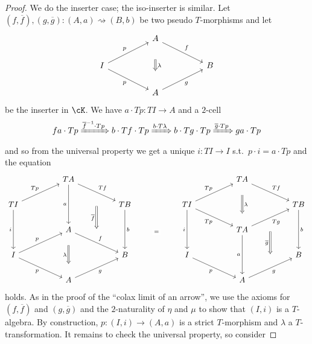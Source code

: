 \documentclass[a4paper,11pt,oneside,openany]{scrbook}
\begin{document}
\begin{proof}
    We do the inserter case; the iso-inserter is similar. Let $(f,\overline{f}),(g,\overline{g})\colon(A,a)\rightsquigarrow(B,b)$ be two pseudo $T$-morphisms and let 
    \[\begin{tikzcd}
	&& A \\
	I &&&& B \\
	&& A
	\arrow["p", from=2-1, to=1-3]
	\arrow["f", from=1-3, to=2-5]
	\arrow["p"', from=2-1, to=3-3]
	\arrow["g"', from=3-3, to=2-5]
	\arrow["\lambda", shorten <=18pt, shorten >=18pt, Rightarrow, from=1-3, to=3-3]
\end{tikzcd}\]
    be the inserter in $\cK$. We have $a\cdot Tp\colon TI\to A$ and a $2$-cell 
    $$fa\cdot Tp\xRightarrow{\overline{f}^{-1}\cdot Tp}b\cdot Tf\cdot Tp\xRightarrow{b\cdot T\lambda} b\cdot Tg\cdot Tp\xRightarrow{\overline{g}\cdot Tp} ga\cdot Tp$$
    and so from the universal property we get a unique $i\colon TI\to I$ s.t.\ $p\cdot i = a\cdot Tp$ and the equation 
    \[\begin{tikzcd}
	&& TA &&& {} &&& TA \\
	TI &&&& TB && TI &&&& TB \\
	&& A &&&&&& TA \\
	I &&&& B && I &&&& B \\
	&& A &&& {} &&& A
	\arrow["Tp", from=2-1, to=1-3]
	\arrow["a"', from=1-3, to=3-3]
	\arrow["i"', from=2-1, to=4-1]
	\arrow["p", from=4-1, to=3-3]
	\arrow[""{name=0, anchor=center, inner sep=0}, "Tf", from=1-3, to=2-5]
	\arrow["b", from=2-5, to=4-5]
	\arrow[""{name=1, anchor=center, inner sep=0}, "f", from=3-3, to=4-5]
	\arrow["p"', from=4-1, to=5-3]
	\arrow["g"', from=5-3, to=4-5]
	\arrow["\lambda"', shorten <=13pt, shorten >=13pt, Rightarrow, from=3-3, to=5-3]
	\arrow["{=}"{description}, draw=none, from=1-6, to=5-6]
	\arrow["Tp", from=2-7, to=1-9]
	\arrow["Tf", from=1-9, to=2-11]
	\arrow["Tp"', from=2-7, to=3-9]
	\arrow[""{name=2, anchor=center, inner sep=0}, "Tg"', from=3-9, to=2-11]
	\arrow["i"', from=2-7, to=4-7]
	\arrow["p"', from=4-7, to=5-9]
	\arrow["a"', from=3-9, to=5-9]
	\arrow["b", from=2-11, to=4-11]
	\arrow[""{name=3, anchor=center, inner sep=0}, "g"', from=5-9, to=4-11]
	\arrow["\lambda", shorten <=13pt, shorten >=13pt, Rightarrow, from=1-9, to=3-9]
	\arrow["{\overline{f}}"', shorten <=17pt, shorten >=17pt, Rightarrow, from=0, to=1]
	\arrow["{\overline{g}}"', shorten <=17pt, shorten >=17pt, Rightarrow, from=2, to=3]
\end{tikzcd}\]
    holds. As in the proof of the ``colax limit of an arrow'', we use the axioms for $(f,\overline{f})$ and $(g,\overline{g})$ and the $2$-naturality of $\eta$ and $\mu$ to show that $(I,i)$ is a $T$-algebra. By construction, $p\colon(I,i)\to(A,a)$ is a strict $T$-morphism and $\lambda$ a $T$-transformation. It remains to check the universal property, so consider 

\end{proof}
\end{document}
